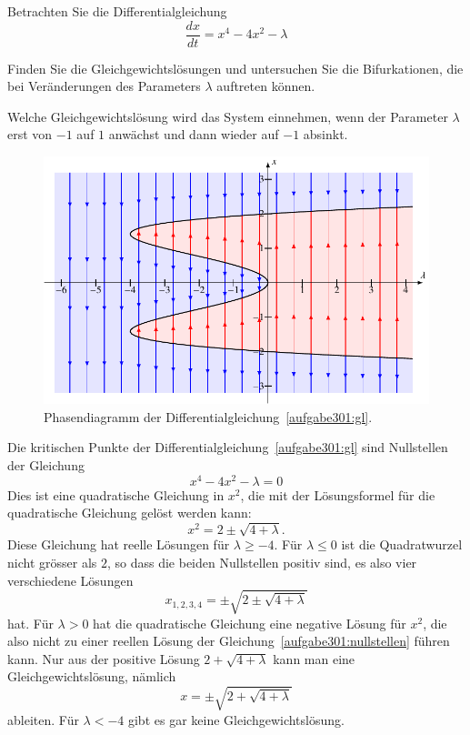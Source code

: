 Betrachten Sie die Differentialgleichung
\begin{equation}
\frac{dx}{dt}
=
x^4-4x^2-\lambda
\label{aufgabe301:gl}
\end{equation}
\begin{teilaufgaben}
\item
Finden Sie die Gleichgewichtslösungen und untersuchen Sie die 
Bifurkationen, die bei Veränderungen des Parameters $\lambda$
auftreten können.
\item
Welche Gleichgewichtslösung wird das System einnehmen, wenn der
Parameter $\lambda$ erst von $-1$ auf $1$ anwächst
und dann wieder auf $-1$ absinkt.
\end{teilaufgaben}

\begin{loesung}
\begin{figure}
\centering
\includegraphics{chapters/3/grad4.pdf}
\caption{Phasendiagramm der Differentialgleichung~\eqref{aufgabe301:gl}.
\label{aufgabe301:fig}}
\end{figure}
\begin{teilaufgaben}
\item
Die kritischen Punkte der Differentialgleichung~\eqref{aufgabe301:gl}
sind Nullstellen der Gleichung
\begin{equation}
x^4-4x^2-\lambda=0
\label{aufgabe301:nullstellen}
\end{equation}
Dies ist eine quadratische Gleichung in $x^2$, die mit der Lösungsformel
für die quadratische Gleichung gelöst werden kann:
\[
x^2 = 2 \pm \!\sqrt{4+\lambda}.
\]
Diese Gleichung hat reelle Lösungen für $\lambda \ge -4$.
Für $\lambda \le 0$ ist die Quadratwurzel nicht grösser als $2$,
so dass die beiden Nullstellen positiv sind, es also vier verschiedene
Lösungen
\begin{equation}
x_{1,2,3,4} = \pm\!\sqrt{2\pm\!\sqrt{4+\lambda}}
\end{equation}
hat.
Für $\lambda >0$ hat die quadratische Gleichung eine negative Lösung
für $x^2$, die also nicht zu einer reellen Lösung der
Gleichung~\eqref{aufgabe301:nullstellen} führen kann.
Nur aus der positive Lösung $2+\!\sqrt{4+\lambda}$ kann man eine
Gleichgewichtslösung, nämlich
\[
x=\pm\!\sqrt{2+\!\sqrt{4+\lambda}}
\]
ableiten.
Für $\lambda < -4$ gibt es gar keine Gleichgewichtslösung.


\end{teilaufgaben}
\end{loesung}
